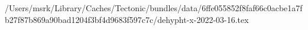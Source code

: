 /Users/msrk/Library/Caches/Tectonic/bundles/data/6ffe055852f8faf66c0acbe1a7fb27f87b869a90bad1204f3bf4d9683f597c7c/dehypht-x-2022-03-16.tex